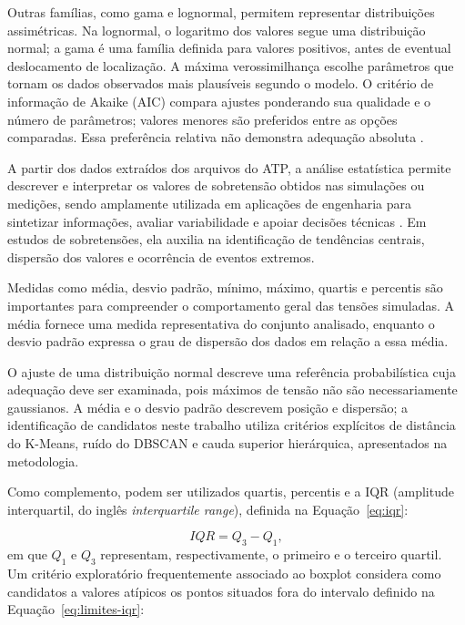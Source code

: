 \documentclass[
	12pt,				%
	openright,			%
	oneside,			%
	a4paper,			%
	chapter=TITLE,		%
	section=TITLE,		%
	subsection=TITLE,	%
	subsubsection=TITLE,%
	english,			%
	brazilian			%
	]{abntex2}
\theoremstyle{definition}
\begin{document}
Outras famílias, como gama e lognormal, permitem representar distribuições
assimétricas. Na lognormal, o logaritmo dos valores segue uma distribuição
normal; a gama é uma família definida para valores positivos, antes de
eventual deslocamento de localização. A máxima verossimilhança escolhe
parâmetros que tornam os dados observados mais plausíveis segundo o modelo.
O critério de informação de Akaike (AIC) compara ajustes ponderando sua
qualidade e o número de parâmetros; valores menores são preferidos entre
as opções comparadas. Essa preferência relativa não demonstra adequação
absoluta \cite{montgomery2020,devore2016}.

A partir dos dados extraídos dos arquivos do ATP, a análise estatística permite descrever e interpretar os valores de sobretensão obtidos nas simulações ou medições, sendo amplamente utilizada em aplicações de engenharia para sintetizar informações, avaliar variabilidade e apoiar decisões técnicas \cite{montgomery2020,devore2016}. Em estudos de sobretensões, ela auxilia na identificação de tendências centrais, dispersão dos valores e ocorrência de eventos extremos.

Medidas como média, desvio padrão, mínimo, máximo, quartis e percentis são importantes para compreender o comportamento geral das tensões simuladas. A média fornece uma medida representativa do conjunto analisado, enquanto o desvio padrão expressa o grau de dispersão dos dados em relação a essa média.

O ajuste de uma distribuição normal descreve uma referência probabilística cuja adequação deve ser examinada, pois máximos de tensão não são necessariamente gaussianos. A média e o desvio padrão descrevem posição e dispersão; a identificação de candidatos neste trabalho utiliza critérios explícitos de distância do K-Means, ruído do DBSCAN e cauda superior hierárquica, apresentados na metodologia.

Como complemento, podem ser utilizados quartis, percentis e a IQR (amplitude interquartil, do inglês \textit{interquartile range}), definida na Equação~\ref{eq:iqr}:

\begin{equation}
\label{eq:iqr}
IQR = Q_3 - Q_1,
\end{equation}
em que $Q_1$ e $Q_3$ representam, respectivamente, o primeiro e o terceiro quartil. Um critério exploratório frequentemente associado ao boxplot considera como candidatos a valores atípicos os pontos situados fora do intervalo definido na Equação~\ref{eq:limites-iqr}:
\end{document}
